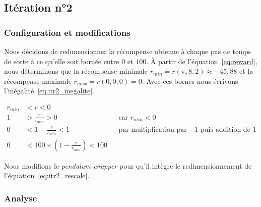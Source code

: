 \subsection{Itération n°2}

\subsubsection{Configuration et modifications}
 
 Nous décidons de redimensionner la récompense obtenue à chaque pas de temps de sorte à ce qu'elle soit bornée entre $0$ et $100$. À partir de l'équation~\eqref{eq:reward}, nous déterminons que la récompense minimale $r_{min} = r(\pi, 8, 2) \approx -45,88$ et la récompense maximale $r_{max} = r(0, 0, 0) = 0$. Avec ces bornes nous écrivons l'inégalité~\eqref{eq:itr2_inegalite}.
 
\begin{align}
    r_{min} &< r < 0 \label{eq:itr2_inegalite} \\
    1 &> \frac{r}{r_{min}} > 0 &&\text{car $r_{min}<0$}\\
    0 &< 1 - \frac{r}{r_{min}} < 1 &&\text{par multiplication par $-1$ puis addition de $1$}\\
    0 &< 100 \times \left( 1 - \frac{r}{r_{min}} \right) < 100 \label{eq:itr2_rescale}
\end{align}
 
Nous modifions le \emph{pendulum wrapper} pour qu'il intègre le redimensionnement de l'équation~\eqref{eq:itr2_rescale}.

\subsubsection{Analyse}


